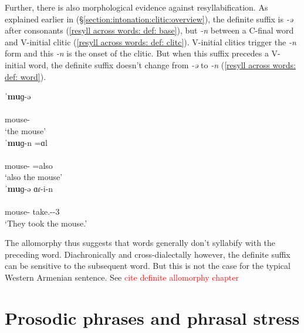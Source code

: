 Further, there is also morphological evidence against resyllabification. As explained earlier in (\S\ref{section:intonation:clitic:overview}), the definite suffix is \textit{-ə} after consonants (\ref{resyll across words: def: base}), but \textit{-n} between a C-final word and V-initial clitic (\ref{resyll across words: def: clitc}). V-initial clitics trigger the \textit{-n} form and this \textit{-n} is the onset of the clitic. But when this suffix precedes a V-initial word, the definite suffix doesn't change from \textit{-ə} to \textit{-n} (\ref{resyll across words: def: word}).

\begin{exe}
	\ex 
	\begin{xlist}
		\ex \glll ˈ\textbf{mu}ɡ-ə \\
		[ˈ\textbf{mu}.ɡə] \\
		mouse-{} \\
		\trans `the mouse'  \label{resyll across words: def: base} \\
		\ex \glll ˈ\textbf{mu}ɡ-n =ɑl \\
		[ˈ\textbf{mu}ɡ. nɑl] \\
		mouse-{} =also \\
		\trans `also the mouse' \label{resyll across words: def: clitc}  \\
		\ex \glll ˈ\textbf{mu}ɡ-ə ɑɾ-i-n \\
		[ˈ\textbf{mu}.ɡə. ɑ.ɾi] \\
		mouse-{} take.{\aorperf}-{\pst}-3{\pl} \\
		\trans `They took the mouse.' \label{resyll across words: def: word}\\
	\end{xlist}
\end{exe}


The allomorphy thus suggests that  words generally don't syllabify with the preceding word.  Diachronically and cross-dialectally however, the definite suffix can be sensitive to the subsequent word. But this is not the case for the typical Western Armenian sentence. See \textcolor{red}{cite definite allomorphy chapter}
\section{Prosodic phrases and phrasal stress}\label{section:intonation:phrase}

